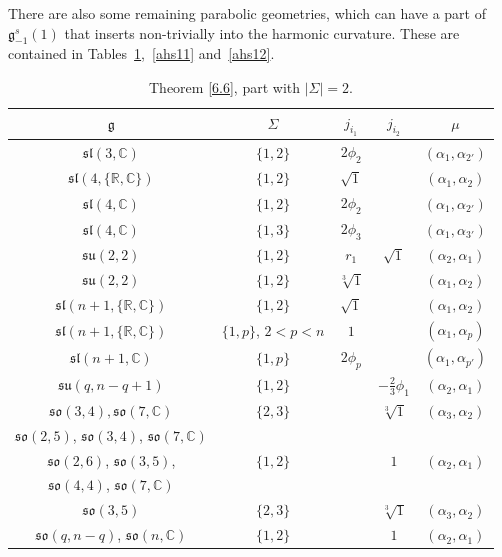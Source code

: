 \documentclass[pdftex]{sigma}
\newcommand{\Si}{\Sigma}
\newcommand{\fg}{\mathfrak g}
\newcommand{\R}{\mathbb{R}}
\newcommand{\C}{\mathbb{C}}
\numberwithin{equation}{section}
\begin{document}
There are also some remaining parabolic geometries, which can have a part of $\fg_{-1}^s(1)$ that inserts non-trivially into the harmonic curvature. These are contained in Tables~\ref{ahs10},~\ref{ahs11} and~\ref{ahs12}.

\begin{table}[th!]\centering\caption{Theorem \ref{6.6}, part with $|\Si|=2$.}\label{ahs10}\vspace{1mm}

\begin{tabular}{|c|c|c|c|c|}
\hline
$\fg$ & $\Sigma$ & $j_{i_1}$& $j_{i_2}$& $\mu$ \\
\hline
\hline
$\mathfrak{sl}(3,\mathbb{C})$ & $\{1,2\}$ &$2\phi_2$&& $(\alpha_{1},\alpha_{2'})$ \\
\hline
$\mathfrak{sl}(4,\{\R,\C\})$ & $\{1,2\}$ & $\sqrt{1}$ & & $(\alpha_1,\alpha_2)$ \\
\hline
$\mathfrak{sl}(4,\mathbb{C})$ & $\{1,2\}$ &$2\phi_2$&& $(\alpha_{1},\alpha_{2'})$ \\
\hline
$\mathfrak{sl}(4,\mathbb{C})$ & $\{1,3\}$ &$2\phi_3$&& $(\alpha_{1},\alpha_{3'})$ \\
\hline
$\mathfrak{su}(2,2)$&$\{1,2\}$&$r_1$& $\sqrt{1} $& $(\alpha_2,\alpha_{1})$\\
\hline
$\mathfrak{su}(2,2)$&$\{1,2\}$&$ \sqrt[3]{1}$&&$(\alpha_1,\alpha_{2})$ \\
\hline
$\mathfrak{sl}(n+1,\{\R,\C\})$ & $\{1,2\}$ & $\sqrt{1}$ & & $(\alpha_1,\alpha_2)$ \\
\hline
$\mathfrak{sl}(n+1,\{\mathbb{R, C}\})$& $\{1,p\}$, $2<p<n$& $1$& & $(\alpha_1,\alpha_p)$\\
\hline
$\mathfrak{sl}(n+1,\mathbb{C})$ & $\{1,p\}$ &$2\phi_p$&& $(\alpha_{1},\alpha_{p'})$ \\
\hline
$\mathfrak{su}(q,n-q+1)$ &$\{1,2\}$&&$-\frac23\phi_1$&$(\alpha_2,\alpha_1)$\\
\hline
$\mathfrak{so}(3,4), \mathfrak{so}(7,\C)$&$\{ 2,3\}$&&$\sqrt[3]{1}$& $(\alpha_3,\alpha_2)$ \\
\hline
$\mathfrak{so}(2,5)$, $\mathfrak{so}(3,4)$, $\mathfrak{so}(7,\mathbb{C})$& && & \\
$\mathfrak{so}(2,6)$, $\mathfrak{so}(3,5)$,& $\{1,2\}$ &&$1$ & $(\alpha_2,\alpha_1)$\\
$\mathfrak{so}(4,4)$, $\mathfrak{so}(7,\mathbb{C})$& & && \\
\hline
$\mathfrak{so}(3,5)$&$\{2,3\}$& &$\sqrt[3]{1} $&$(\alpha_3,\alpha_2)$\\
\hline
$\mathfrak{so}(q,n-q)$, $\mathfrak{so}(n,\mathbb{C})$& $\{1,2\}$ &&$1$ & $(\alpha_2,\alpha_1)$\\

\end{tabular}
\end{table}
\end{document}
